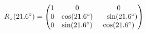\documentclass[preview]{standalone}
\begin{document}
\begin{align*}
\special{dvisvgm:raw <g id='unique000'>}R_x(21.6^\circ) = \begin{pmatrix} 1 & 0 & 0 \\ 0 & \cos(21.6^\circ) & -\sin(21.6^\circ) \\ 0 & \sin(21.6^\circ) & \cos(21.6^\circ) \end{pmatrix}\special{dvisvgm:raw </g>}
\end{align*}
\end{document}
